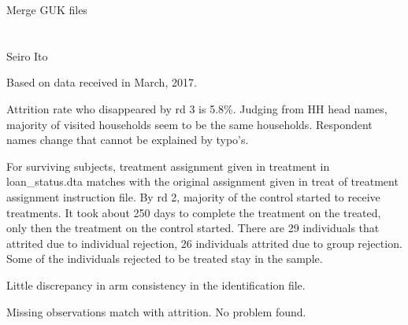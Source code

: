




\setlength{\baselineskip}{12pt}





\hfil Merge GUK files\\

\hfil\MonthDY\\
\hfil{\footnotesize\currenttime}\\

\hfil Seiro Ito

\setcounter{tocdepth}{3}
\tableofcontents

\setlength{\parindent}{1em}
\vspace{2ex}
Based on data received in March, 2017.

\begin{description}
\vspace{1.0ex}\setlength{\itemsep}{1.0ex}\setlength{\baselineskip}{12pt}
\item[Attrition] Attrition rate who disappeared by rd 3 is 5.8\%. Judging from HH head names, majority of visited households seem to be the same households. Respondent names change that cannot be explained by typo's.
\item[Treatment assignment] For surviving subjects, treatment assignment given in \textsf{treatment} in loan\_status.dta matches with the original assignment given in \textsf{treat} of treatment assignment instruction file. By rd 2, majority of the control started to receive treatments. It took about 250 days to complete the treatment on the treated, only then the treatment on the control started. There are 29 individuals that attrited due to individual rejection, 26 individuals attrited due to group rejection. Some of the individuals rejected to be treated stay in the sample.
\item[Arm] Little discrepancy in arm consistency in the identification file.
\item[Food consumption]	Missing observations match with attrition. No problem found.
\end{description}



